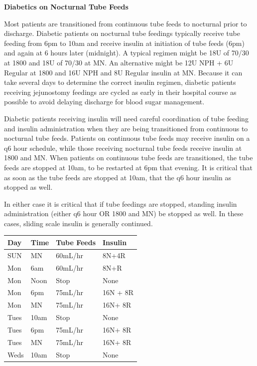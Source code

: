 \documentclass[
]{book}
\begin{document}
\textbf{Diabetics on Nocturnal Tube Feeds}

Most patients are transitioned from continuous tube feeds to nocturnal prior to discharge. Diabetic patients on nocturnal tube feedings typically receive tube feeding from 6pm to 10am and receive insulin at initiation of tube feeds (6pm) and again at 6 hours later (midnight). A typical regimen might be 18U of 70/30 at 1800 and 18U of 70/30 at MN. An alternative might be 12U NPH + 6U Regular at 1800 and 16U NPH and 8U Regular insulin at MN. Because it can take several days to determine the correct insulin regimen, diabetic patients receiving jejunostomy feedings are cycled as early in their hospital course as possible to avoid delaying discharge for blood sugar management.

Diabetic patients receiving insulin will need careful coordination of tube feeding and insulin administration when they are being transitioned from continuous to nocturnal tube feeds. Patients on continuous tube feeds may receive insulin on a q6 hour schedule, while those receiving nocturnal tube feeds receive insulin at 1800 and MN. When patients on continuous tube feeds are transitioned, the tube feeds are stopped at 10am, to be restarted at 6pm that evening. It is critical that as soon as the tube feeds are stopped at 10am, that the q6 hour insulin as stopped as well.

In either case it is critical that if tube feedings are stopped, standing insulin administration (either q6 hour OR 1800 and MN) be stopped as well. In these cases, sliding scale insulin is generally continued.

\begin{longtable}[]{@{}llll@{}}
\toprule\noalign{}
Day & Time & Tube Feeds & Insulin \\
\midrule\noalign{}
\endhead
\bottomrule\noalign{}
\endlastfoot
SUN & MN & 60mL/hr & 8N+4R \\
Mon & 6am & 60mL/hr & 8N+R \\
Mon & Noon & Stop & None \\
Mon & 6pm & 75mL/hr & 16N + 8R \\
Mon & MN & 75mL/hr & 16N+ 8R \\
Tues & 10am & Stop & None \\
Tues & 6pm & 75mL/hr & 16N+ 8R \\
Tues & MN & 75mL/hr & 16N+ 8R \\
Weds & 10am & Stop & None \\
\end{longtable}
\end{document}
